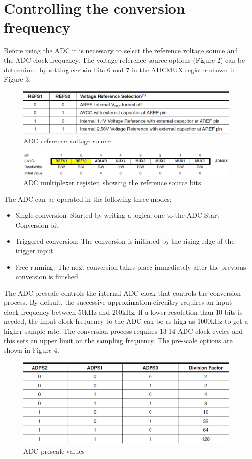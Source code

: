 \documentclass[english]{article}
\begin{document}
\section{Controlling the conversion frequency}
Before using the ADC it is necessary to select the reference voltage source and the ADC clock frequency. The voltage reference source options (Figure 2) can be determined by setting certain bits 6 and 7 in the ADCMUX register shown in Figure 3.
\begin{figure}[H]
\centerline{\includegraphics[scale=0.8]{MicroLab8/2}}
\caption{ADC reference voltage source}
\end{figure}
\begin{figure}[H]
\centerline{\includegraphics[scale=0.8]{MicroLab8/3}}
\caption{ADC multiplexer register, showing the reference source bits}
\end{figure}
The ADC can be operated in the following three modes: 
\begin{itemize}
\item Single conversion: Started by writing a logical one to the ADC Start Conversion bit
\item Triggered conversion: The conversion is initiated by the rising edge of the trigger input
\item Free running: The next conversion takes place immediately after the previous conversion is finished
\end{itemize}
The ADC prescale controls the internal ADC clock that controls the conversion process. By default, the successive approximation circuitry requires an input clock frequency between 50kHz and 200kHz. If a lower resolution than 10 bits is needed, the input clock frequency to the ADC can be as high as 1000kHz to get a higher sample rate. The conversion process requires 13-14 ADC clock cycles and this sets an upper limit on the sampling frequency. The pre-scale options are shown in Figure 4.
\begin{figure}[H]
\centerline{\includegraphics[scale=0.8]{MicroLab8/4}}
\caption{ADC prescale values}
\end{figure}	
\end{document}

